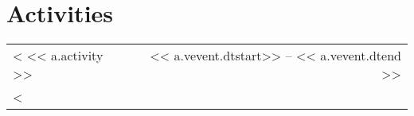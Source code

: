 \section{Activities}

\begin{tabularx}{0.97\linewidth}{Xr}
<%
<< a.activity >> & << a.vevent.dtstart>> -- << a.vevent.dtend >> \\
<%
\end{tabularx}

